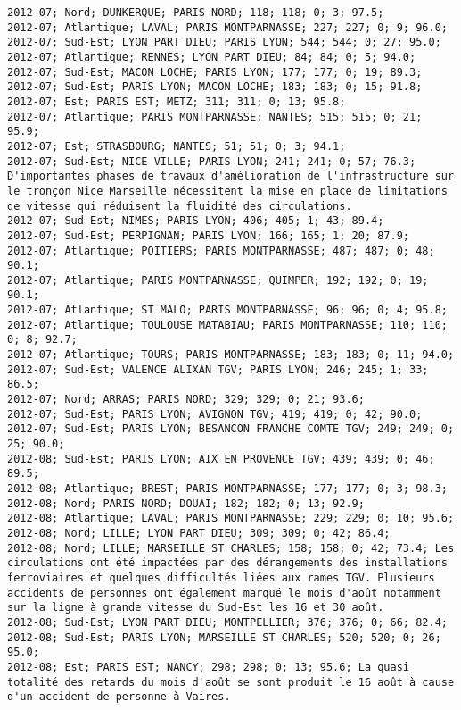 \documentclass{article}
\begin{document}
\begin{Verbatim}[commandchars=\\\{\}]
2012-07; Nord; DUNKERQUE; PARIS NORD; 118; 118; 0; 3; 97.5; 
2012-07; Atlantique; LAVAL; PARIS MONTPARNASSE; 227; 227; 0; 9; 96.0; 
2012-07; Sud-Est; LYON PART DIEU; PARIS LYON; 544; 544; 0; 27; 95.0; 
2012-07; Atlantique; RENNES; LYON PART DIEU; 84; 84; 0; 5; 94.0; 
2012-07; Sud-Est; MACON LOCHE; PARIS LYON; 177; 177; 0; 19; 89.3; 
2012-07; Sud-Est; PARIS LYON; MACON LOCHE; 183; 183; 0; 15; 91.8; 
2012-07; Est; PARIS EST; METZ; 311; 311; 0; 13; 95.8; 
2012-07; Atlantique; PARIS MONTPARNASSE; NANTES; 515; 515; 0; 21; 95.9; 
2012-07; Est; STRASBOURG; NANTES; 51; 51; 0; 3; 94.1; 
2012-07; Sud-Est; NICE VILLE; PARIS LYON; 241; 241; 0; 57; 76.3; D'importantes phases de travaux d'amélioration de l'infrastructure sur le tronçon Nice Marseille nécessitent la mise en place de limitations de vitesse qui réduisent la fluidité des circulations.
2012-07; Sud-Est; NIMES; PARIS LYON; 406; 405; 1; 43; 89.4; 
2012-07; Sud-Est; PERPIGNAN; PARIS LYON; 166; 165; 1; 20; 87.9; 
2012-07; Atlantique; POITIERS; PARIS MONTPARNASSE; 487; 487; 0; 48; 90.1; 
2012-07; Atlantique; PARIS MONTPARNASSE; QUIMPER; 192; 192; 0; 19; 90.1; 
2012-07; Atlantique; ST MALO; PARIS MONTPARNASSE; 96; 96; 0; 4; 95.8; 
2012-07; Atlantique; TOULOUSE MATABIAU; PARIS MONTPARNASSE; 110; 110; 0; 8; 92.7; 
2012-07; Atlantique; TOURS; PARIS MONTPARNASSE; 183; 183; 0; 11; 94.0; 
2012-07; Sud-Est; VALENCE ALIXAN TGV; PARIS LYON; 246; 245; 1; 33; 86.5; 
2012-07; Nord; ARRAS; PARIS NORD; 329; 329; 0; 21; 93.6; 
2012-07; Sud-Est; PARIS LYON; AVIGNON TGV; 419; 419; 0; 42; 90.0; 
2012-07; Sud-Est; PARIS LYON; BESANCON FRANCHE COMTE TGV; 249; 249; 0; 25; 90.0; 
2012-08; Sud-Est; PARIS LYON; AIX EN PROVENCE TGV; 439; 439; 0; 46; 89.5; 
2012-08; Atlantique; BREST; PARIS MONTPARNASSE; 177; 177; 0; 3; 98.3; 
2012-08; Nord; PARIS NORD; DOUAI; 182; 182; 0; 13; 92.9; 
2012-08; Atlantique; LAVAL; PARIS MONTPARNASSE; 229; 229; 0; 10; 95.6; 
2012-08; Nord; LILLE; LYON PART DIEU; 309; 309; 0; 42; 86.4; 
2012-08; Nord; LILLE; MARSEILLE ST CHARLES; 158; 158; 0; 42; 73.4; Les circulations ont été impactées par des dérangements des installations ferroviaires et quelques difficultés liées aux rames TGV. Plusieurs accidents de personnes ont également marqué le mois d'août notamment sur la ligne à grande vitesse du Sud-Est les 16 et 30 août.
2012-08; Sud-Est; LYON PART DIEU; MONTPELLIER; 376; 376; 0; 66; 82.4; 
2012-08; Sud-Est; PARIS LYON; MARSEILLE ST CHARLES; 520; 520; 0; 26; 95.0; 
2012-08; Est; PARIS EST; NANCY; 298; 298; 0; 13; 95.6; La quasi totalité des retards du mois d'août se sont produit le 16 août à cause d'un accident de personne à Vaires.

\end{Verbatim}
\end{document}
